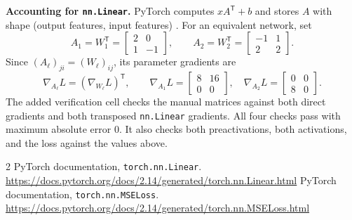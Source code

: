 \documentclass[11pt]{article}
\begin{document}
\textbf{Accounting for \texttt{nn.Linear}.} PyTorch computes
$xA^{\mathsf T}+b$ and stores $A$ with shape (output features, input
features) \cite{linear}. For an equivalent network, set
\[
A_1=W_1^{\mathsf T}=\begin{bmatrix}2&0\\1&-1\end{bmatrix},\qquad
A_2=W_2^{\mathsf T}=\begin{bmatrix}-1&1\\2&2\end{bmatrix}.
\]
Since $(A_\ell)_{ji}=(W_\ell)_{ij}$, its parameter gradients are
\[
\nabla_{A_\ell}L=(\nabla_{W_\ell}L)^{\mathsf T},\qquad
\nabla_{A_1}L=\begin{bmatrix}8&16\\0&0\end{bmatrix},\quad
\nabla_{A_2}L=\begin{bmatrix}0&0\\8&0\end{bmatrix}.
\]
The added verification cell checks the manual matrices against both
direct gradients and both transposed \texttt{nn.Linear} gradients.
All four checks pass with maximum absolute error $0$. It also checks
both preactivations, both activations, and the loss against the values above.

\begingroup\small
\begin{thebibliography}{2}
 PyTorch documentation, \texttt{torch.nn.Linear}.
\url{https://docs.pytorch.org/docs/2.14/generated/torch.nn.Linear.html}
 PyTorch documentation, \texttt{torch.nn.MSELoss}.
\url{https://docs.pytorch.org/docs/2.14/generated/torch.nn.MSELoss.html}
\end{thebibliography}
\endgroup
\end{document}
